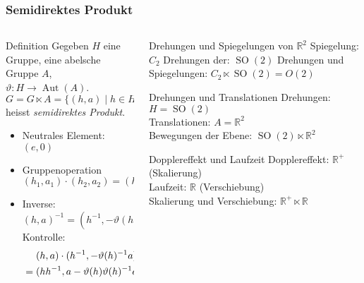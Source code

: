 %
%
%
\bgroup
\begin{frame}[t]
\setlength{\abovedisplayskip}{5pt}
\setlength{\belowdisplayskip}{5pt}
\frametitle{Semidirektes Produkt}
\vspace{-20pt}
\begin{columns}[t,onlytextwidth]
\begin{column}{0.48\textwidth}
\begin{block}{Definition}
Gegeben $H$ eine Gruppe, eine abelsche Gruppe $A$,
$\vartheta\colon H\to\operatorname{Aut}(A)$.
\[
G
=
G\ltimes A
=
\{(h,a) \;|\; h\in H,a\in A\}
\]
heisst {\em semidirektes Produkt}.
\begin{itemize}
\item
Neutrales Element: $(e,0)$
\item
Gruppenoperation
\[
(h_1,a_1)\cdot(h_2,a_2)
=
(h_1h_2, a_1 + \vartheta(h_1)a_2)
\]
\item
Inverse:
$(h,a)^{-1}
=
(h^{-1},-\vartheta(h)^{-1}a)
$
Kontrolle:
\begin{align*}
&\phantom{\mathstrut=\mathstrut}
(h,a)\cdot (h^{-1},-\vartheta(h)^{-1}a)
\\
&=(hh^{-1},a-\vartheta(h)\vartheta(h)^{-1}a)
=(e,0)
\end{align*}
\end{itemize}
\end{block}
\end{column}
\begin{column}{0.48\textwidth}
\begin{block}{Drehungen und Spiegelungen von $\mathbb{R}^2$}
Spiegelung: $C_2$
Drehungen der: $\operatorname{SO}(2)$
Drehungen und Spiegelungen:
$C_2\ltimes \operatorname{SO}(2)=O(2)$
\end{block}
\begin{block}{Drehungen und Translationen}
Drehungen: $H=\operatorname{SO}(2)$
\\
Translationen: $A=\mathbb{R}^2$
\\
Bewegungen der Ebene: $\operatorname{SO}(2)\ltimes \mathbb{R}^2$
\end{block}
\begin{block}{Dopplereffekt und Laufzeit}
Dopplereffekt: $\mathbb{R}^+$ (Skalierung)
\\
Laufzeit: $\mathbb{R}$ (Verschiebung)
\\
Skalierung und Verschiebung: $\mathbb{R}^+\ltimes \mathbb{R}$
\end{block}
\end{column}
\end{columns}
\end{frame}
\egroup
